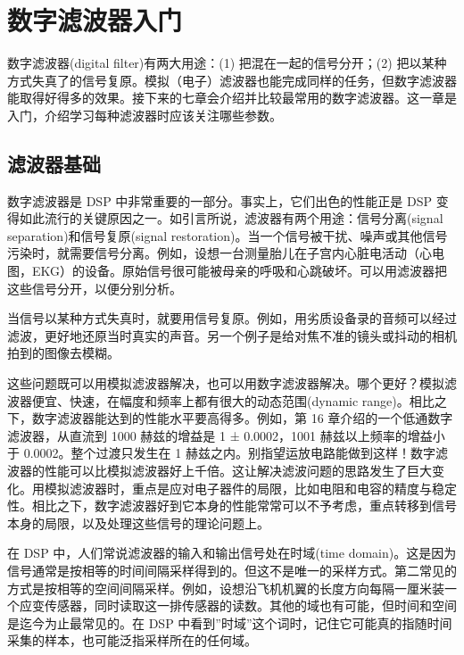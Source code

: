 
\chapter{数字滤波器入门}\label{ch-14}

数字滤波器(digital filter)有两大用途：(1) 把混在一起的信号分开；(2)
把以某种方式失真了的信号复原。模拟（电子）滤波器也能完成同样的任务，但数字滤波器能取得好得多的效果。接下来的七章会介绍并比较最常用的数字滤波器。这一章是入门，介绍学习每种滤波器时应该关注哪些参数。

\section{滤波器基础}

数字滤波器是 DSP 中非常重要的一部分。事实上，它们出色的性能正是 DSP
变得如此流行的关键原因之一。如引言所说，滤波器有两个用途：信号分离(signal
separation)和信号复原(signal
restoration)。当一个信号被干扰、噪声或其他信号污染时，就需要信号分离。例如，设想一台测量胎儿在子宫内心脏电活动（心电图，EKG）的设备。原始信号很可能被母亲的呼吸和心跳破坏。可以用滤波器把这些信号分开，以便分别分析。

当信号以某种方式失真时，就要用信号复原。例如，用劣质设备录的音频可以经过滤波，更好地还原当时真实的声音。另一个例子是给对焦不准的镜头或抖动的相机拍到的图像去模糊。

这些问题既可以用模拟滤波器解决，也可以用数字滤波器解决。哪个更好？模拟滤波器便宜、快速，在幅度和频率上都有很大的动态范围(dynamic
range)。相比之下，数字滤波器能达到的性能水平要高得多。例如，第 16
章介绍的一个低通数字滤波器，从直流到 1000 赫兹的增益是 1 ± 0.0002，1001
赫兹以上频率的增益小于 0.0002。整个过渡只发生在 1
赫兹之内。别指望运放电路能做到这样！数字滤波器的性能可以比模拟滤波器好上千倍。这让解决滤波问题的思路发生了巨大变化。用模拟滤波器时，重点是应对电子器件的局限，比如电阻和电容的精度与稳定性。相比之下，数字滤波器好到它本身的性能常常可以不予考虑，重点转移到信号本身的局限，以及处理这些信号的理论问题上。

在 DSP 中，人们常说滤波器的输入和输出信号处在时域(time
domain)。这是因为信号通常是按相等的时间间隔采样得到的。但这不是唯一的采样方式。第二常见的方式是按相等的空间间隔采样。例如，设想沿飞机机翼的长度方向每隔一厘米装一个应变传感器，同时读取这一排传感器的读数。其他的域也有可能，但时间和空间是迄今为止最常见的。在
DSP
中看到''时域''这个词时，记住它可能真的指随时间采集的样本，也可能泛指采样所在的任何域。


